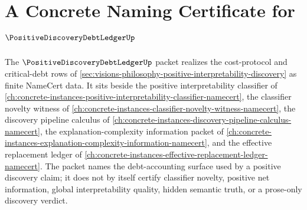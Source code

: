 \chapter{A Concrete Naming Certificate for $\PositiveDiscoveryDebtLedgerUp$}
\label{ch:concrete-instances-positive-discovery-debt-ledger-namecert}

The $\PositiveDiscoveryDebtLedgerUp$ packet realizes the cost-protocol and critical-debt rows of \autoref{sec:visions-philosophy-positive-interpretability-discovery} as finite NameCert data. It sits beside the positive interpretability classifier of \autoref{ch:concrete-instances-positive-interpretability-classifier-namecert}, the classifier novelty witness of \autoref{ch:concrete-instances-classifier-novelty-witness-namecert}, the discovery pipeline calculus of \autoref{ch:concrete-instances-discovery-pipeline-calculus-namecert}, the explanation-complexity information packet of \autoref{ch:concrete-instances-explanation-complexity-information-namecert}, and the effective replacement ledger of \autoref{ch:concrete-instances-effective-replacement-ledger-namecert}. The packet names the debt-accounting surface used by a positive discovery claim; it does not by itself certify classifier novelty, positive net information, global interpretability quality, hidden semantic truth, or a prose-only discovery verdict.

